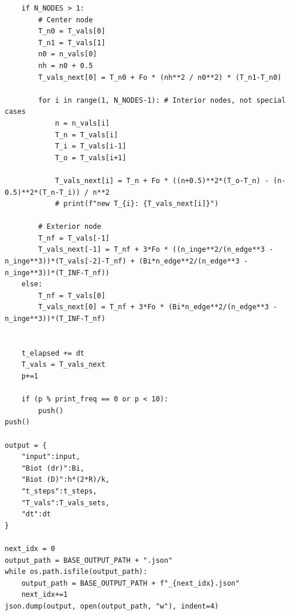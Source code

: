 \documentclass[12pt]{article}
\begin{document}
\begin{verbatim}
    if N_NODES > 1:
        # Center node
        T_n0 = T_vals[0]
        T_n1 = T_vals[1]
        n0 = n_vals[0]
        nh = n0 + 0.5
        T_vals_next[0] = T_n0 + Fo * (nh**2 / n0**2) * (T_n1-T_n0) 

        for i in range(1, N_NODES-1): # Interior nodes, not special cases
            n = n_vals[i]
            T_n = T_vals[i]
            T_i = T_vals[i-1]
            T_o = T_vals[i+1]

            T_vals_next[i] = T_n + Fo * ((n+0.5)**2*(T_o-T_n) - (n-0.5)**2*(T_n-T_i)) / n**2
            # print(f"new T_{i}: {T_vals_next[i]}")

        # Exterior node
        T_nf = T_vals[-1]
        T_vals_next[-1] = T_nf + 3*Fo * ((n_inge**2/(n_edge**3 - n_inge**3))*(T_vals[-2]-T_nf) + (Bi*n_edge**2/(n_edge**3 - n_inge**3))*(T_INF-T_nf))
    else:
        T_nf = T_vals[0]
        T_vals_next[0] = T_nf + 3*Fo * (Bi*n_edge**2/(n_edge**3 - n_inge**3))*(T_INF-T_nf)

    
    t_elapsed += dt
    T_vals = T_vals_next
    p+=1
    
    if (p % print_freq == 0 or p < 10):
        push()
push()

output = {
    "input":input,
    "Biot (dr)":Bi,
    "Biot (D)":h*(2*R)/k,
    "t_steps":t_steps,
    "T_vals":T_vals_sets,
    "dt":dt
}

next_idx = 0
output_path = BASE_OUTPUT_PATH + ".json"
while os.path.isfile(output_path):
    output_path = BASE_OUTPUT_PATH + f"_{next_idx}.json"
    next_idx+=1
json.dump(output, open(output_path, "w"), indent=4)

\end{verbatim}
\end{document}
